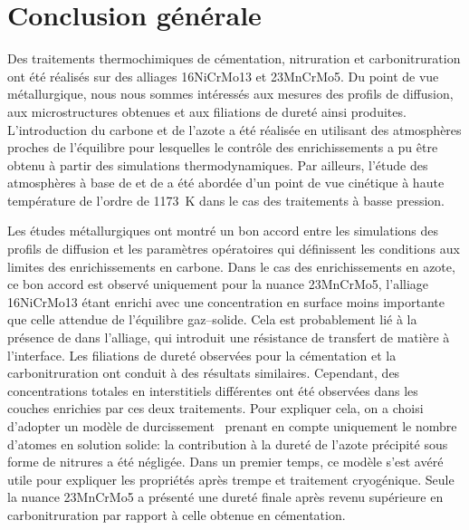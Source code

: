 \chapter*{Conclusion générale}

Des traitements thermochimiques de cémentation, nitruration et carbonitruration ont été réalisés sur des alliages 16NiCrMo13 et 23MnCrMo5. Du point de vue métallurgique, nous nous sommes intéressés aux mesures des profils de diffusion, aux microstructures obtenues et aux filiations de dureté ainsi produites. L'introduction du carbone et de l'azote a été réalisée en utilisant des atmosphères proches de l'équilibre pour lesquelles le contrôle des enrichissements a pu être obtenu à partir des simulations thermodynamiques. Par ailleurs, l'étude des atmosphères à base de  et de  a été abordée d'un point de vue cinétique à haute température \textendash{} de l'ordre de \SI{1173}{\kelvin} \textendash{} dans le cas des traitements à basse pression.

Les études métallurgiques ont montré un bon accord entre les simulations des profils de diffusion et les paramètres opératoires qui définissent les conditions aux limites des enrichissements en carbone. Dans le cas des enrichissements en azote, ce bon accord est observé uniquement pour la nuance 23MnCrMo5, l'alliage 16NiCrMo13 étant enrichi avec une concentration en surface moins importante que celle attendue de l'équilibre gaz--solide. Cela est probablement lié à la présence de  dans l'alliage, qui introduit une résistance de transfert de matière à l'interface. Les filiations de dureté observées pour la cémentation et la carbonitruration ont conduit à des résultats similaires. Cependant, des concentrations totales en interstitiels différentes ont été observées dans les couches enrichies par ces deux traitements. Pour expliquer cela, on a choisi d'adopter un modèle de durcissement~\cite{Cohen1968,Norstrom1976,Hutchinson20115845} prenant en compte uniquement le nombre d'atomes en solution solide: la contribution à la dureté de l'azote précipité sous forme de nitrures  a été négligée. Dans un premier temps, ce modèle s'est avéré utile pour expliquer les propriétés après trempe et traitement cryogénique. Seule la nuance 23MnCrMo5 a présenté une dureté finale après revenu supérieure en carbonitruration par rapport à celle obtenue en cémentation.

